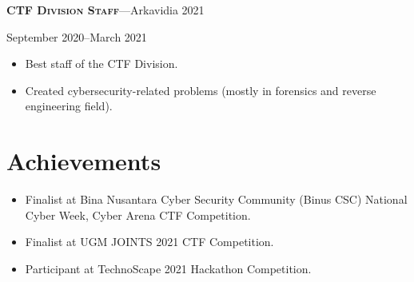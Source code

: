 \documentclass[10pt]{article}
\newcommand{\workExpVspace}{1em}
\newcommand{\orgExp}[5]{
    \noindent \textbf{\textsc{#1}}---#2

    {#3}--{#4}

    {#5}
    \vspace{\workExpVspace}
}
\begin{document}
\orgExp
    {CTF Division Staff}
    {Arkavidia 2021}
    {September 2020}
    {March 2021}
    {
        \begin{itemize}
            \item Best staff of the CTF Division.
            \item Created cybersecurity-related problems (mostly in forensics and reverse
                engineering field).
        \end{itemize}
    }

\section{Achievements}

\begin{itemize}
    \item Finalist at Bina Nusantara Cyber Security Community (Binus CSC)
        National Cyber Week, Cyber Arena CTF Competition.
    \item Finalist at UGM JOINTS 2021 CTF Competition.
    \item Participant at TechnoScape 2021 Hackathon Competition.
\end{itemize}
\end{document}
